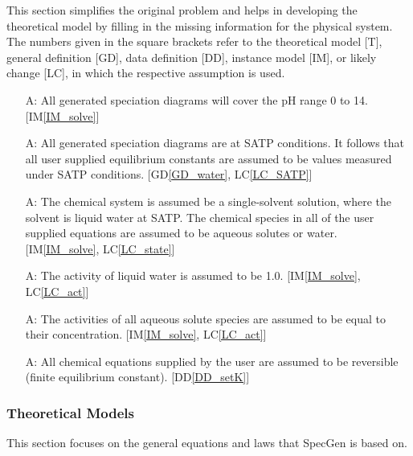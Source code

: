 \documentclass[12pt]{article}
\newcommand{\dref}[1]{GD\ref{#1}}
\newcommand{\ddref}[1]{DD\ref{#1}}
\newcounter{assumpnum} %
\newcommand{\iref}[1]{IM\ref{#1}}
\newcommand{\lcref}[1]{LC\ref{#1}}
\newcommand{\progname}{SpecGen} %
\begin{document}
This section simplifies the original problem and helps in developing the
theoretical model by filling in the missing information for the physical
system. The numbers given in the square brackets refer to the theoretical model
[T], general definition [GD], data definition [DD], instance model [IM], or
likely change [LC], in which the respective assumption is used.

\begin{itemize}
\item[A\refstepcounter{assumpnum}\theassumpnum \label{A_pH}:]
  All generated speciation diagrams will cover the pH range 0 to 14. [\iref{IM_solve}]
\item[A\refstepcounter{assumpnum}\theassumpnum \label{A_SATP}:]
  All generated speciation diagrams are at SATP conditions.  It follows that all user supplied equilibrium constants are assumed to be values measured under SATP conditions. [\dref{GD_water}, \lcref{LC_SATP}]
\item[A\refstepcounter{assumpnum}\theassumpnum \label{A_only_aq}:]
  The chemical system is assumed be a single-solvent solution, where the solvent is liquid water at SATP.  The chemical species in all of the user supplied equations are assumed to be aqueous solutes or water. [\iref{IM_solve}, \lcref{LC_state}]
\item[A\refstepcounter{assumpnum}\theassumpnum \label{A_act_wat}:]
  The activity of liquid water is assumed to be 1.0. [\iref{IM_solve}, \lcref{LC_act}]
\item[A\refstepcounter{assumpnum}\theassumpnum \label{A_act_aq}:]
  The activities of all aqueous solute species are assumed to be equal to their concentration. [\iref{IM_solve}, \lcref{LC_act}]
\item[A\refstepcounter{assumpnum}\theassumpnum \label{A_rev}:]
  All chemical equations supplied by the user are assumed to be reversible (finite equilibrium constant). [\ddref{DD_setK}]
\end{itemize}

\subsubsection{Theoretical Models}\label{sec_theoretical}

This section focuses on the general equations and laws that \progname{} is based
on.

~\newline
\end{document}
